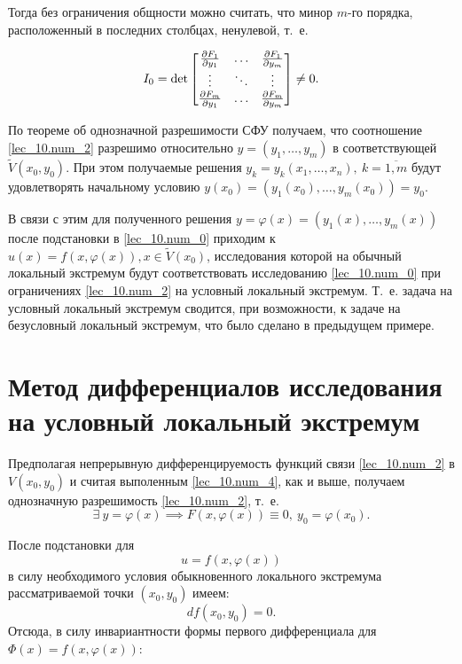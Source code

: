 \documentclass[../../main.tex]{subfiles}
\begin{document}
Тогда без ограничения общности можно считать, что минор
$m$-го порядка, расположенный в последних столбцах, ненулевой, т.~е.

\begin{equation} \label{lec_10.num_4}
	I_0 = \det \begin{bmatrix}
	\frac{\partial F_1}{\partial y_1} & \ldots & \frac{\partial F_1}{\partial y_m} \\
	\vdots & \ddots & \vdots \\
	\frac{\partial F_m}{\partial y_1} & \ldots & \frac{\partial F_m}{\partial y_m}
	\end{bmatrix} \ne 0.
\end{equation}

По теореме об однозначной разрешимости СФУ получаем, что 
соотношение \eqref{lec_10.num_2} разрешимо относительно $y = \left( 
y_1, \ldots, y_m \right)$ в соответствующей $\widetilde{V} (x_0, y_0)$.
При этом получаемые решения $y_k = y_k \left( x_1, \ldots, x_n 
\right),\ k = \overline{1, m}$ будут удовлетворять начальному условию
$y(x_0) = \left( y_1(x_0), \ldots, y_m(x_0) \right) = y_0$.

В связи с этим для полученного решения $y = \varphi(x) = \left( 
y_1(x), \ldots, y_m(x) \right)$ после подстановки в \eqref{lec_10.num_0} 
приходим к $u(x) = f( x, \varphi(x) ), x \in \widetilde{V}(x_0)$, 
исследования которой на обычный локальный экстремум будут 
соответствовать исследованию \eqref{lec_10.num_0} 
при ограничениях \eqref{lec_10.num_2} на условный локальный экстремум.
Т.~е. задача на условный локальный экстремум сводится, при возможности, 
к задаче на безусловный 
локальный экстремум, что было сделано в предыдущем примере.

\section{Метод дифференциалов исследования на условный локальный экстремум}

Предполагая непрерывную дифференцируемость функций связи \eqref{lec_10.num_2} 
в $V(x_0, y_0)$ и считая выполенным \eqref{lec_10.num_4}, как и выше,
получаем однозначную разрешимость \eqref{lec_10.num_2}, т.~е.
\[\exists\:y = \varphi(x) \implies F( x, \varphi(x)) \equiv 0,\ 
y_0 = \varphi(x_0).\]

После подстановки для
\begin{equation} \label{lec_10.num_5}
	u = f( x, \varphi(x) )
\end{equation}
в силу необходимого условия обыкновенного локального экстремума 
рассматриваемой точки $(x_0, y_0)$ имеем:
\[ df(x_0, y_0) = 0. \]
Отсюда, в силу инвариантности формы первого дифференциала для 
$\Phi(x) = f( x, \varphi(x) )$:
\end{document}
